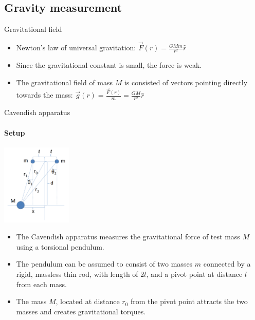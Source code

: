 \documentclass{beamer}
\begin{document}
\subsection{Gravity measurement}
\begin{frame}{Gravitational field}
	
	\begin{itemize}
		\item Newton's law of universal gravitation: $\overrightarrow{F}(r) = \frac{GMm}{r^2}\hat{r}$
		\pause
		\item Since the gravitational constant is small, the force is weak.
		\pause
		\item The gravitational field of mass $M$ is consisted of vectors pointing directly towards the mass: $\overrightarrow{g}(r) = \frac{\overrightarrow{F}(r)}{m} = \frac{GM}{r^2}\hat{r}$ 
		\end{itemize}
\end{frame}
\begin{frame}{Cavendish apparatus}
\framesubtitle{Setup}
	\begin{center}		
		\includegraphics[width=0.25\textwidth,keepaspectratio]{Cavendish apparatus.PNG}
    \end{center}
	\begin{itemize}
		\item The Cavendish apparatus measures the gravitational force of test mass $M$ using a torsional pendulum.
		\pause
		\item The pendulum can be assumed to consist of two masses $m$ connected by a rigid, massless thin rod, with length of $2l$, and a pivot point at distance $l$ from each mass.
		\pause
		\item The mass $M$, located at distance $r_0$ from the pivot point attracts the two masses and creates gravitational torques.
	\end{itemize}
\end{frame}
\end{document}

